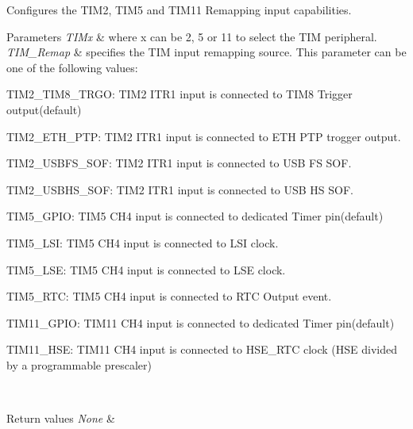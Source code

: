 Configures the T\+I\+M2, T\+I\+M5 and T\+I\+M11 Remapping input capabilities. 


\begin{DoxyParams}{Parameters}
{\em T\+I\+Mx} & where x can be 2, 5 or 11 to select the T\+I\+M peripheral. \\
\hline
{\em T\+I\+M\+\_\+\+Remap} & specifies the T\+I\+M input remapping source. This parameter can be one of the following values\+: \begin{DoxyItemize}
\item T\+I\+M2\+\_\+\+T\+I\+M8\+\_\+\+T\+R\+G\+O\+: T\+I\+M2 I\+T\+R1 input is connected to T\+I\+M8 Trigger output(default) \item T\+I\+M2\+\_\+\+E\+T\+H\+\_\+\+P\+T\+P\+: T\+I\+M2 I\+T\+R1 input is connected to E\+T\+H P\+T\+P trogger output. \item T\+I\+M2\+\_\+\+U\+S\+B\+F\+S\+\_\+\+S\+O\+F\+: T\+I\+M2 I\+T\+R1 input is connected to U\+S\+B F\+S S\+O\+F. \item T\+I\+M2\+\_\+\+U\+S\+B\+H\+S\+\_\+\+S\+O\+F\+: T\+I\+M2 I\+T\+R1 input is connected to U\+S\+B H\+S S\+O\+F. \item T\+I\+M5\+\_\+\+G\+P\+I\+O\+: T\+I\+M5 C\+H4 input is connected to dedicated Timer pin(default) \item T\+I\+M5\+\_\+\+L\+S\+I\+: T\+I\+M5 C\+H4 input is connected to L\+S\+I clock. \item T\+I\+M5\+\_\+\+L\+S\+E\+: T\+I\+M5 C\+H4 input is connected to L\+S\+E clock. \item T\+I\+M5\+\_\+\+R\+T\+C\+: T\+I\+M5 C\+H4 input is connected to R\+T\+C Output event. \item T\+I\+M11\+\_\+\+G\+P\+I\+O\+: T\+I\+M11 C\+H4 input is connected to dedicated Timer pin(default) \item T\+I\+M11\+\_\+\+H\+S\+E\+: T\+I\+M11 C\+H4 input is connected to H\+S\+E\+\_\+\+R\+T\+C clock (H\+S\+E divided by a programmable prescaler) \end{DoxyItemize}
\\
\hline
\end{DoxyParams}

\begin{DoxyRetVals}{Return values}
{\em None} & \\
\hline
\end{DoxyRetVals}
